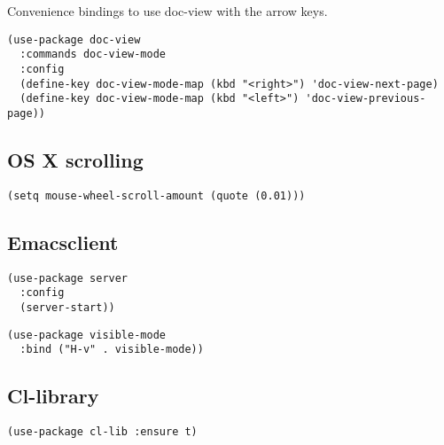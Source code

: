 \documentclass[11pt]{article}
\begin{document}
Convenience bindings to use doc-view with the arrow keys.

\begin{verbatim}
(use-package doc-view
  :commands doc-view-mode
  :config
  (define-key doc-view-mode-map (kbd "<right>") 'doc-view-next-page)
  (define-key doc-view-mode-map (kbd "<left>") 'doc-view-previous-page))
\end{verbatim}

\subsection{OS X scrolling}
\label{sec-21-4}

\begin{verbatim}
(setq mouse-wheel-scroll-amount (quote (0.01)))
\end{verbatim}

\subsection{Emacsclient}
\label{sec-21-5}

\begin{verbatim}
(use-package server
  :config
  (server-start))
\end{verbatim}

\begin{verbatim}
(use-package visible-mode
  :bind ("H-v" . visible-mode))
\end{verbatim}
\subsection{Cl-library}
\label{sec-21-6}

\begin{verbatim}
(use-package cl-lib :ensure t)
\end{verbatim}
\end{document}
